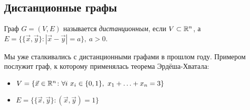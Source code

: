 \subsection{Дистанционные графы}

\begin{definition}
	Граф $G = (V, E)$ называется \textit{дистанционным}, если $V \subset \mathbb{R}^n$, а $E = \{\{\vec{x}, \vec{y}\} \colon |\vec{x} - \vec{y}| = a\},\ a > 0$.
\end{definition}

\begin{example}
	Мы уже сталкивались с дистанционными графами в прошлом году. Примером послужит граф, к которому применялась теорема Эрдёша-Хватала: 
	\begin{itemize}
		\item \(V = \{\vec{x} \in \mathbb{R}^n \colon \forall i\ x_i \in \{0, 1\},\ x_1 + \ldots + x_n = 3\}\)
		
		\item \(E = \{\{\vec{x}, \vec{y}\} \colon (\vec{x}, \vec{y}) = 1\}\)
	\end{itemize}
\end{example}